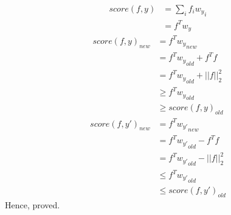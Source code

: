 \documentclass[12pt, fleqn]{article}
\begin{document}
\subsubsection{}
\begin{equation*}
  \begin{aligned}
    score(f, y) & = \sum_i f_i {w_y}_i \\
                & = f^T w_y
  \end{aligned}
\end{equation*}
\begin{equation*}
  \begin{aligned}
    score(f, y)_{new} & = f^T {w_y}_{new}             \\
                      & = f^T {w_y}_{old} + f^T f     \\
                      & = f^T {w_y}_{old} + ||f||_2^2 \\
                      & \ge f^T {w_y}_{old}           \\
                      & \ge score(f, y)_{old}
  \end{aligned}
\end{equation*}
\begin{equation*}
  \begin{aligned}
    score(f, y')_{new} & = f^T {w_{y'}}_{new}             \\
                       & = f^T {w_{y'}}_{old} - f^T f     \\
                       & = f^T {w_{y'}}_{old} - ||f||_2^2 \\
                       & \le f^T {w_{y'}}_{old}           \\
                       & \le score(f, y')_{old}
  \end{aligned}
\end{equation*}
Hence, proved.
\end{document}
